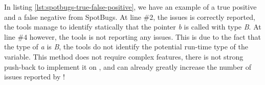 \begin{enumerate}
	
	
	In listing \ref{lst:spotbugs-true-false-positive}, we have an example of a true positive and a false negative from SpotBugs. At line $\#2$, the issues is correctly reported, the tools manage to identify statically that the pointer \emph{b} is called with type \emph{B}. At line $\#4$ however, the tools is not reporting any issues. This is due to the fact that the type of \emph{a} is \emph{B}, the tools do not identify the potential run-time type of the variable.\newline
	This method does not require complex features, there is not strong push-back to implement it on \slang{}, and can already greatly increase the number of issues reported by \slang{}!
\end{enumerate}




